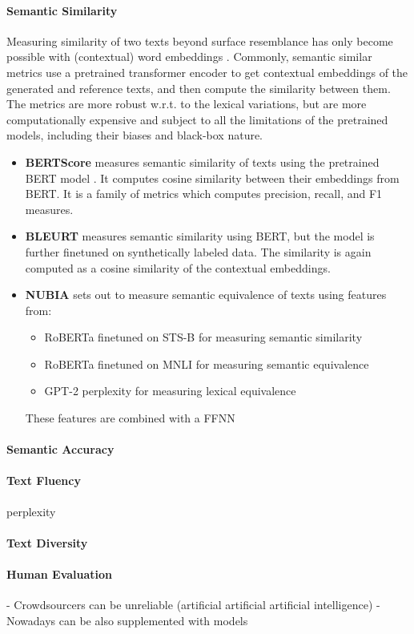 \paragraph{Semantic Similarity} Measuring similarity of two texts beyond surface resemblance has only become possible with (contextual) word embeddings \cite{peters2018deep,devlinBERTPretrainingDeep2019,liuRoBERTaRobustlyOptimized2019}. Commonly, semantic similar metrics use a pretrained transformer encoder to get contextual embeddings of the generated and reference texts, and then compute the similarity between them. The metrics are more robust w.r.t. to the lexical variations, but are more computationally expensive and subject to all the limitations of the pretrained models, including their biases and black-box nature.

\begin{itemize}
    \item \textbf{BERTScore} \cite{zhang2019bertscore} measures semantic similarity of texts using the pretrained BERT model \cite{devlinBERTPretrainingDeep2019}. It computes cosine similarity between their embeddings from BERT. It is a family of metrics which computes precision, recall, and F1 measures.
    \item \textbf{BLEURT} \cite{sellam2020bleurt} measures semantic similarity using BERT, but the model is further finetuned on synthetically labeled data. The similarity is again computed as a cosine similarity of the contextual embeddings.
    \item \textbf{NUBIA} \cite{kaneNUBIANeUralBased2020} sets out to measure semantic equivalence of texts using features from:
          \begin{itemize}
              \item RoBERTa finetuned on STS-B for measuring semantic similarity
              \item RoBERTa finetuned on MNLI for measuring semantic equivalence
              \item GPT-2 perplexity for measuring lexical equivalence
          \end{itemize}
          These features are combined with a FFNN
\end{itemize}

\paragraph{Semantic Accuracy}

\paragraph{Text Fluency} perplexity
\paragraph{Text Diversity}

\paragraph{Human Evaluation}
- Crowdsourcers can be unreliable (artificial artificial artificial intelligence)
- Nowadays can be also supplemented with models